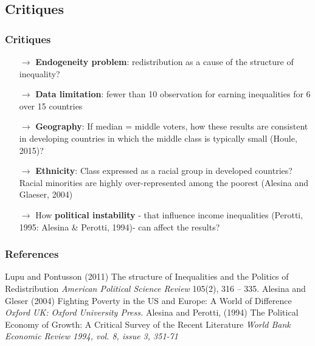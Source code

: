 \documentclass{beamer}
\begin{document}
\begin{frame}
\subsection{Critiques}
\frametitle{Critiques}
\begin{itemize}
\item[$\longrightarrow$] \textbf{Endogeneity problem}: redistribution as a cause of the structure of inequality?
\item[$\longrightarrow$]\textbf{Data limitation}: fewer than 10 observation for earning inequalities for 6 over 15 countries
\item[$\longrightarrow$] \textbf{Geography}: If median = middle voters, how these results are consistent in developing countries in which the middle class is typically small (Houle, 2015)?
\item[$\longrightarrow$] \textbf{Ethnicity}: Class expressed as a racial group in developed countries? Racial minorities are highly over-represented among the poorest (Alesina and Glaeser, 2004)
\item[$\longrightarrow$] How \textbf{political instability} - that influence income inequalities (Perotti, 1995: Alesina \& Perotti, 1994)- can affect the results? 
\end{itemize}
\end{frame}

\begin{frame}
\frametitle{References}
\footnotesize{
\begin{thebibliography}{99} %
 Lupu and Pontusson (2011)
\newblock The structure of Inequalities and the Politics of Redistribution
\newblock \emph{American Political Science Review} 105(2), 316 -- 335.
 Alesina and Gleser (2004)
\newblock Fighting Poverty in the US and Europe: A World of Difference
\newblock \emph{Oxford UK: Oxford University Press.} 
 Alesina and Perotti, (1994)
\newblock The Political Economy of Growth: A Critical Survey of the Recent Literature
\newblock \emph{World Bank Economic Review 1994, vol. 8, issue 3, 351-71} 


\end{thebibliography}
}
\end{frame}
\end{document}
